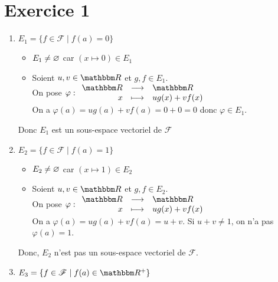 \part{Exercice 1}

\begin{enumerate}
	\item $E_1 = \{f \in \mathcal{F}  \mid  f(a) = 0\}$ \\
		\begin{itemize}
			\item $E_1 \neq \varnothing$ car $(x\mapsto 0) \in E_1$
			\item Soient $u,v \in \R$ et $g, f \in E_1$.\\
				On pose $\varphi : \begin{array}{rcl}
					\R &\longrightarrow& \R \\
					x &\longmapsto& ug(x) + vf(x)
				\end{array}$\\
				On a $\varphi(a) = ug(a) + vf(a) = 0 + 0 = 0$ donc $\varphi \in E_1$.
		\end{itemize}
		Donc $E_1$ est un sous-espace vectoriel de $\mathcal{F}$
	\item $E_2 = \{f \in \mathcal{F} \mid  f(a) = 1\}$
		\begin{itemize}
			\item $E_2 \neq \varnothing$ car $(x\mapsto 1) \in E_2$
			\item Soient  $u,v \in \R$ et $g, f \in E_2$.\\
				On pose $\varphi : \begin{array}{rcl}
					\R &\longrightarrow& \R \\
					x &\longmapsto& ug(x) + vf(x)
				\end{array}$\\
				On a $\varphi(a) = ug(a) + vf(a) = u + v$. Si  $u + v \neq 1$, on n'a pas $\varphi(a) = 1$.
		\end{itemize}
		Donc, $E_2$ n'est pas un sous-espace vectoriel de $\mathcal{F}$.
	\item $E_3 = \{f \in \mathcal{F} \mid f(a) \in \R^+ \}$
\end{enumerate}
